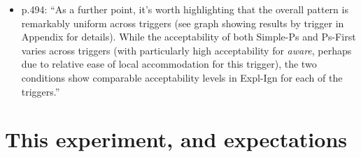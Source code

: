 \documentclass[11pt,fleqn]{article}
\newcommand{\6}{\mbox{$[\hspace*{-.6mm}[$}}
\newcommand{\9}{\mbox{$]\hspace*{-.6mm}]$}}
\begin{document}
\begin{itemize}
\begin{itemize}
\item p.494: ``As a further point, it's worth highlighting that the overall pattern is remarkably uniform across triggers (see graph showing results by trigger in Appendix for details). While the acceptability of both Simple-Ps and Ps-First varies across triggers (with particularly high acceptability for {\em aware}, perhaps due to relative ease of local accommodation for this trigger), the two conditions show comparable acceptability levels in Expl-Ign for each of the triggers.''

\end{itemize}

\end{itemize}

\section{This experiment, and expectations}
\end{document}
